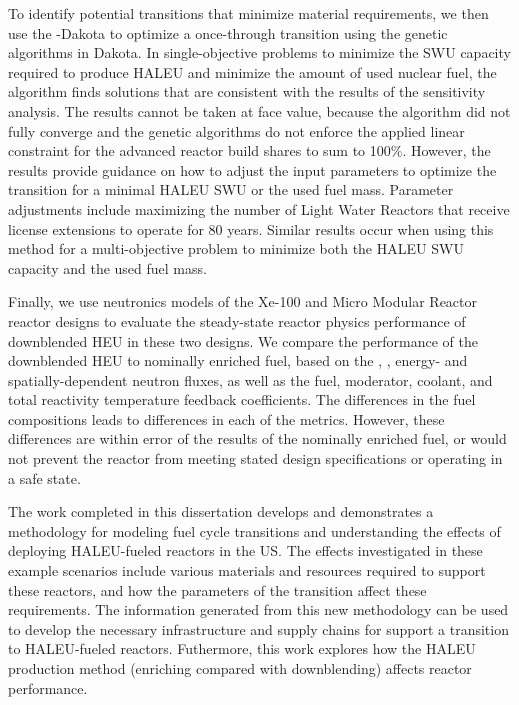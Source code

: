 To identify potential transitions that minimize material requirements,
we then use the \Cyclus-Dakota to optimize a once-through transition
using the genetic algorithms in Dakota. In single-objective problems to 
minimize the \gls{SWU} capacity required to produce \gls{HALEU} and 
minimize the amount of used nuclear fuel, the algorithm finds 
solutions that are consistent with the results of the 
sensitivity analysis. The results cannot be taken at face 
value, because the algorithm did not fully converge and the genetic 
algorithms do not enforce the applied
linear constraint for the advanced reactor build shares to sum to 
100\%. However, the results provide guidance on how to 
adjust the 
input parameters to optimize the transition for a minimal \gls{HALEU} 
\gls{SWU} or the used fuel mass. Parameter adjustments include 
maximizing the 
number of Light Water Reactors that receive license extensions to 
operate for 80 years. Similar results occur when using 
this method for a multi-objective problem to minimize both the 
\gls{HALEU} \gls{SWU} capacity and the used fuel mass. 

Finally, we use neutronics models of the Xe-100 and Micro Modular Reactor 
reactor designs to 
evaluate the steady-state reactor physics performance of downblended 
\gls{HEU} in these 
two designs. We compare the performance of the downblended 
\gls{HEU} to nominally enriched fuel, based on the 
\keff, \betaEff, energy- and spatially-dependent neutron 
fluxes, as well as the fuel, moderator, coolant, and total reactivity 
temperature feedback coefficients. The differences in the fuel 
compositions leads to differences in each of the metrics. 
However, these differences are within error of the 
results of the nominally enriched fuel, or would not prevent the 
reactor from meeting stated design specifications or operating 
in a safe state. 

The work completed in this dissertation develops and demonstrates a 
methodology for modeling fuel cycle transitions and  
understanding the effects of deploying \gls{HALEU}-fueled reactors 
in the US. The effects investigated in these example scenarios 
include various materials and 
resources required to support these reactors, and how the 
parameters of the transition affect these requirements. The 
information generated from this new methodology can be used 
to develop the necessary infrastructure 
and supply chains for support a transition to \gls{HALEU}-fueled 
reactors. Futhermore, this work explores how the 
\gls{HALEU} production method (enriching compared with downblending)
affects reactor performance. 

